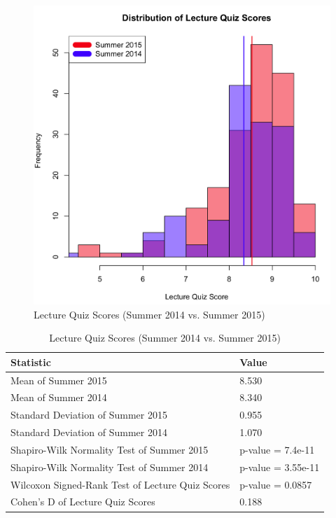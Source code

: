 \begin{figure}
	\centering
	\includegraphics[width=5in]{img/chapter4/lq_su15_vs_su14}
	\caption[Lecture Quiz Scores (Summer 2014 vs. Summer 2015)]{Lecture Quiz Scores (Summer 2014 vs. Summer 2015)}
  \label{fig:lqSu14Su15}
\end{figure}

\begin{small}
\begin{table}
  \centering
  \begin{tabular}{|l|l|}
    \hline
    \textbf{Statistic} & \textbf{Value} \\
	\hline
	Mean of Summer 2015 & 8.530 \\
	\hline
	Mean of Summer 2014 & 8.340 \\
	\hline
	Standard Deviation of Summer 2015 & 0.955 \\
	\hline
	Standard Deviation of Summer 2014 & 1.070 \\
	\hline
	Shapiro-Wilk Normality Test of Summer 2015 & p-value = 7.4e-11 \\
	\hline
	Shapiro-Wilk Normality Test of Summer 2014 & p-value = 3.55e-11 \\
	\hline
	Wilcoxon Signed-Rank Test of Lecture Quiz Scores & p-value = 0.0857 \\
	\hline
	Cohen's D of Lecture Quiz Scores & 0.188 \\
	\hline
  \end{tabular}
	\caption[Lecture Quiz Scores (Summer 2014 vs. Summer 2015)]{Lecture Quiz Scores (Summer 2014 vs. Summer 2015)}
  \label{tab:lqSu14Su15}
\end{table}
\end{small}

